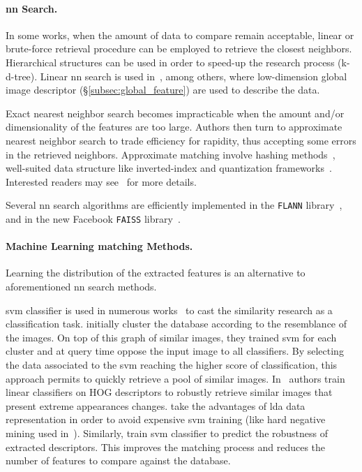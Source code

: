 \paragraph{\Acl{nn} Search.}
In some works, when the amount of data to compare remain acceptable, linear or brute-force retrieval procedure can be employed to retrieve the closest neighbors. Hierarchical structures can be used in order to speed-up the research process (\eg k-d-tree). Linear \ac{nn} search is used in~\citep{Babenko2014,Sunderhauf2015,Radenovic2016,Gordo2016,Arandjelovic2017,Zamir2010,Zamir2014,Sunderhauf2015a}, among others, where low-dimension global image descriptor (\S\ref{subsec:global_feature}) are used to describe the data.

Exact nearest neighbor search becomes impracticable when the amount and/or dimensionality of the features are too large. Authors then turn to approximate nearest neighbor search to trade efficiency for rapidity, thus accepting some errors in the retrieved neighbors. Approximate matching involve hashing methods~\citep{Gionis1999}, well-suited data structure like inverted-index and quantization frameworks~\citep{Nister2006,Philbin2007,Jegou2011}. Interested readers may see~\citep{Wang2017} for more details.

Several \ac{nn} search algorithms are efficiently implemented in the \texttt{FLANN} library~\citep{Muja2009}, and in the new Facebook \texttt{FAISS} library~\citep{Johnson2017}.

\paragraph{Machine Learning matching Methods.}
Learning the distribution of the extracted features is an alternative to aforementioned \ac{nn} search methods.

\Ac{svm} classifier is used in numerous works~\citep{Shrivastava2011,Cao2013,McManus2014,Aubry2014} to cast the similarity research as a classification task. \citet{Cao2013} initially cluster the database according to the resemblance of the images. On top of this graph of similar images, they trained \ac{svm} for each cluster and at query time oppose the input image to all classifiers. By selecting the data associated to the \ac{svm} reaching the higher score of classification, this approach permits to quickly retrieve a pool of similar images. In~\citep{McManus2014,Aubry2014} authors train linear classifiers on HOG descriptors to robustly retrieve similar images that present extreme appearances changes. \citet{Aubry2014} take the advantages of \ac{lda} data representation in order to avoid expensive \ac{svm} training (like hard negative mining used in~\citep{Shrivastava2011,Kim2015}). Similarly, \citet{Kim2015} train \ac{svm} classifier to predict the robustness of extracted descriptors. This improves the matching process and reduces the number of features to compare against the database.

